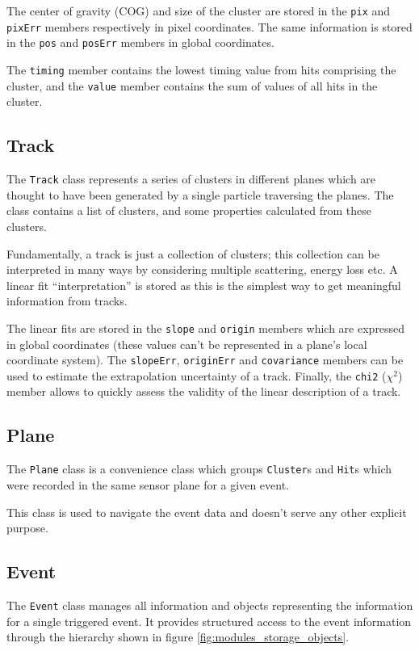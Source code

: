 \documentclass[10pt,a4paper]{book}
\begin{document}
The center of gravity (COG) and size of the cluster are stored in the \Verb`pix` and \Verb`pixErr` members respectively in pixel coordinates. The same information is stored in the \Verb`pos` and \Verb`posErr` members in global coordinates.

The \Verb`timing` member contains the lowest timing value from hits comprising the cluster, and the \Verb`value` member contains the sum of values of all hits in the cluster.

\subsection{Track}

The \Verb`Track` class represents a series of clusters in different planes which are thought to have been generated by a single particle traversing the planes. The class contains a list of clusters, and some properties calculated from these clusters.

Fundamentally, a track is just a collection of clusters; this collection can be interpreted in many ways by considering multiple scattering, energy loss etc. A linear fit ``interpretation'' is stored as this is the simplest way to get meaningful information from tracks.

The linear fits are stored in the \Verb`slope` and \Verb`origin` members which are expressed in global coordinates (these values can't be represented in a plane's local coordinate system). The \Verb`slopeErr`, \Verb`originErr` and \Verb`covariance` members can be used to estimate the extrapolation uncertainty of a track. Finally, the \Verb`chi2` ($\chi^2$) member allows to quickly assess the validity of the linear description of a track.

\subsection{Plane}

The \Verb`Plane` class is a convenience class which groups \Verb`Cluster`s and \Verb`Hit`s which were recorded in the same sensor plane for a given event.

This class is used to navigate the event data and doesn't serve any other explicit purpose.

\subsection{Event}

The \Verb`Event` class manages all information and objects representing the information for a single triggered event. It provides structured access to the event information through the hierarchy shown in figure \ref{fig:modules_storage_objects}.
 
\end{document}
